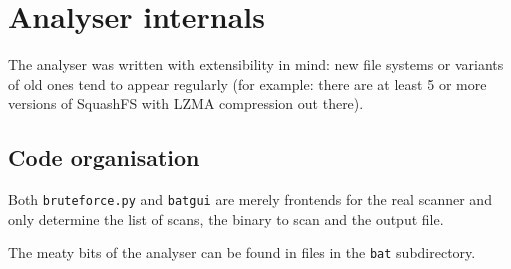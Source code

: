 \documentclass[10pt]{article}
\begin{document}
\appendix

\section{Analyser internals}

The analyser was written with extensibility in mind: new file systems or
variants of old ones tend to appear regularly (for example: there are at
least 5 or more versions of SquashFS with LZMA compression out there).

\subsection{Code organisation}

Both \texttt{bruteforce.py} and \texttt{batgui} are merely frontends for the
real scanner and only determine the list of scans, the binary to scan and the
output file.

The meaty bits of the analyser can be found in files in the \texttt{bat}
subdirectory.
\end{document}
